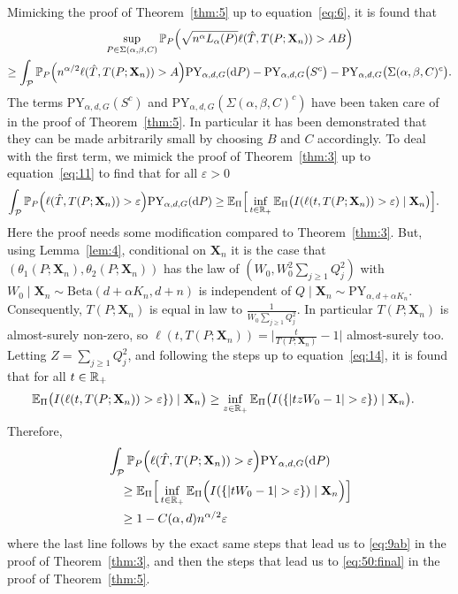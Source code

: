 \documentclass{article}
\newcommand{\1}{\boldsymbol{1}}
\newcommand{\EE}{\mathbb{E}}
\newcommand{\PP}{\mathbb{P}}
\theoremstyle{plain}
\begin{document}
Mimicking the proof of Theorem~\ref{thm:5} up to equation~\eqref{eq:6}, it is found that
  \begin{multline*}
    \sup_{P\in \Sigma(\alpha,\beta,C)}\PP_P\Big( \sqrt{n^{\alpha}L_{\alpha}(P)} \ell(\hat{T},T(P;\mathbf{X}_n)) > AB \Big)\\%
    \geq \int_{\mathcal{P}}\PP_P\Big(n^{\alpha/2}\ell(\hat{T},T(P;\mathbf{X}_n)) > A \Big) \mathrm{PY}_{\alpha,d,G}(\intd P)%
    - \mathrm{PY}_{\alpha,d,G}\big(S^c\big)%
    - \mathrm{PY}_{\alpha,d,G}\big( \Sigma(\alpha,\beta,C)^c \big).
  \end{multline*}
  The terms $\mathrm{PY}_{\alpha,d,G}(S^c)$ and $\mathrm{PY}_{\alpha,d,G}( \Sigma(\alpha,\beta,C)^c)$ have been taken care of in the proof of Theorem~\ref{thm:5}. In particular it has been demonstrated that they can be made arbitrarily small by choosing $B$ and $C$ accordingly. To deal with the first term, we mimick the proof of Theorem~\ref{thm:3} up to equation~\eqref{eq:11} to find that for all $\varepsilon > 0$
  \begin{align*}
    \int_{\mathcal{P}}\PP_P\Big( \ell(\hat{T},T(P;\mathbf{X}_n)) > \varepsilon \Big) \mathrm{PY}_{\alpha,d,G}(\intd P)%
    &\geq \EE_{\Pi}\Big[ \inf_{t\in \NNReals}\EE_{\Pi}\big( I(\ell(t,T(P;\mathbf{X}_n))> \varepsilon)  \mid \mathbf{X}_n\big) \Big].
  \end{align*}
  Here the proof needs some modification compared to Theorem~\ref{thm:3}. But, using Lemma~\ref{lem:4}, conditional on $\mathbf{X}_n$ it is the case that $(\theta_1(P;\mathbf{X}_n),\theta_2(P;\mathbf{X}_n))$ has the law of $(W_0,W_0^2\sum_{j\geq 1}Q_j^2)$ with $W_0 \mid \mathbf{X}_n \sim\mathrm{Beta}(d + \alpha K_n, d + n)$ is independent of $Q \mid \mathbf{X}_n \sim \mathrm{PY}_{\alpha,d+\alpha K_n}$. Consequently, $T(P;\mathbf{X}_n)$ is equal in law to $\frac{1}{W_0\sum_{j\geq 1}Q_j^2}$. In particular $T(P;\mathbf{X}_n)$ is almost-surely non-zero, so $\ell(t,T(P;\mathbf{X}_n)) = \big|\frac{t}{T(P;\mathbf{X}_n)} -1 \big|$ almost-surely too. Letting $Z = \sum_{j\geq 1}Q_j^2$, and following the steps up to equation~\eqref{eq:14}, it is found that for all $t\in \mathbb{R}_{+}$
  \begin{align*}
    \EE_{\Pi}\big(I( \ell(t,T(P;\mathbf{X}_n)) > \varepsilon\} ) \mid \mathbf{X}_n\big)
    &\geq \inf_{z\in \NNReals} \EE_{\Pi}\big(I( \{ |t z W_0 - 1| > \varepsilon\} ) \mid \mathbf{X}_n\big).
  \end{align*}
  Therefore,
  \begin{align*}
    &\int_{\mathcal{P}}\PP_P\Big(\ell(\hat{T},T(P;\mathbf{X}_n)) > \varepsilon \Big) \mathrm{PY}_{\alpha,d,G}(\intd P)\\
    &\quad\geq%
      \EE_{\Pi}\Big[\inf_{t\in \NNReals}\EE_{\Pi}\Big(I( \{|tW_0 - 1|>\varepsilon \} ) \mid \mathbf{X}_n \Big) \Big]\\
    &\quad\geq 1 - C(\alpha,d)n^{\alpha/2}\varepsilon
  \end{align*}
  where the last line follows by the exact same steps that lead us to \eqref{eq:9ab} in the proof of Theorem~\ref{thm:3}, and then the steps that lead us to \eqref{eq:50:final} in the proof of Theorem~\ref{thm:5}.
\end{document}
